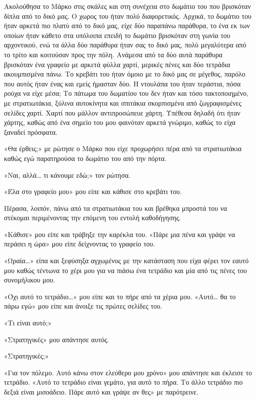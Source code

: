 \documentclass[12pt,twoside, openany]{book}
\begin{document}
Ακολούθησα το Μάρκο στις σκάλες και στη συνέχεια στο δωμάτιο του που βρισκόταν δίπλα από το δικό μας. Ο χωρος του ήταν πολύ διαφορετικός. Αρχικά, το δωμάτιο του ήταν αρκετά πιο πλατύ από το δικό μας, είχε δύο παραπάνω παράθυρα, το ένα εκ των οποίων ήταν κάθετο στα υπόλοιπα επειδή το δωμάτιο βρισκόταν στη γωνία του αρχοντικού, ενώ τα άλλα δύο παράθυρα ήταν σας το δικό μας, πολύ μεγαλύτερα από το τρίτο και κοιτούσαν προς την πόλη. Ανάμεσα από τα δύο αυτά παράθυρα βρισκόταν ένα γραφείο με αρκετά φύλλα χαρτί, μερικές πένες και δύο τετράδια ακουμπισμένα πάνω. Το κρεβάτι του ήταν όμοιο με το δικό μας σε μέγεθος, παρόλο που αυτός ήταν ένας και εμείς ήμασταν δύο. Η ντουλάπα του ήταν τεράστια, πόσα ρούχα να είχε μέσα; Το πάτωμα του δωματίου του δεν ήταν και τόσο τακτοποιημένο, με στρατιωτάκια, ξύλινα αυτοκίνητα και σπιτάκια σκορπισμένα από ζωγραφισμένες σελίδες χαρτί. Χαρτί που μάλλον αντιπροσώπευε χάρτη. Υπέθεσα δηλαδή ότι ήταν χάρτης, καθώς από ένα σημείο του μου φαινόταν αρκετά γνώριμο, καθώς το είχα ξαναδεί πρόσφατα.

«Θα έρθεις;» με ρώτησε ο Μάρκο που είχε προχωρήσει πέρα από τα στρατιωτάκια καθώς εγώ παρατηρούσα το δωμάτιο του από την πόρτα.

«Ναι, αλλά… τι κάνουμε εδώ;» τον ρώτησα.

«Έλα στο γραφείο μου» μου είπε και κάθισε στο κρεβάτι του.

Πέρασα, λοιπόν, πάνω από τα στρατιωτάκια του και βρέθηκα μπροστά του να στέκομαι περιμένοντας την επόμενη του εντολή καθοδήγησης.

«Κάθισε» μου είπε και τράβηξε την καρέκλα του. «Πάρε μια πένα και γράψε να περάσει η ώρα» μου είπε δείχνοντας το γραφείο του.

«Ωραία…» είπα και ξεφύσηξα αγχωμένος με την κατάσταση που είχα φέρει τον εαυτό μου καθώς τέντωνα το χέρι μου για να πιάσω ένα τετράδιο και μία από τις πένες του συνομήλικου μου.

«Όχι αυτό το τετράδιο…» μου είπε και το πήρε από τα χέρια μου. «Αυτό… θα το πάρω εγώ» μου είπε και άνοιξε τις πρώτες σελίδες του.

«Τι είναι αυτό;»

«Στρατηγικές» μου απάντησε αυτός.

«Στρατηγικές;»

«Για τον πόλεμο. Αυτό κάνω στον ελεύθερο μου χρόνο» μου απάντησε και έκλεισε το τετράδιο. «Αυτό το τετράδιο είναι γεμάτο, για αυτό το πήρα. Το άλλο τετράδιο πιο δεξιά είναι μισοάδειο. Πάρε αυτό και γράψε αν θες» με παρότρεινε.
\end{document}
